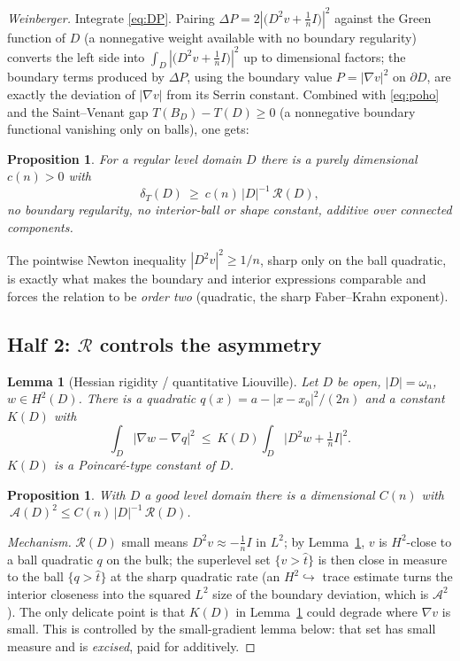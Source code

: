 \documentclass[11pt]{amsart}
\newtheorem{proposition}[theorem]{Proposition}
\newtheorem{lemma}[theorem]{Lemma}
\theoremstyle{definition}
\theoremstyle{remark}
\newcommand{\dT}{\delta_T}
\newcommand{\Asym}{\mathcal A}
\newcommand{\R}{\mathcal R}
\newcommand{\TF}{\bigl(D^2v+\tfrac1n I\bigr)}
\begin{document}
\emph{Weinberger.} Integrate \eqref{eq:DP}. Pairing $\Delta P=2|\TF|^2$
against the Green function of $D$ (a nonnegative weight available with
no boundary regularity) converts the left side into $\int_D|\TF|^2$ up
to dimensional factors; the boundary terms produced by $\Delta P$,
using the boundary value $P=|\nabla v|^2$ on $\partial D$, are exactly
the deviation of $|\nabla v|$ from its Serrin constant. Combined with
\eqref{eq:poho} and the Saint--Venant gap
$T(B_D)-T(D)\ge0$ (a nonnegative boundary functional vanishing only on
balls), one gets:
\begin{proposition}\label{prop:half1}
For a regular level domain $D$ there is a purely dimensional
$c(n)>0$ with
\[
  \dT(D)\ \ge\ c(n)\,|D|^{-1}\,\R(D),
\]
no boundary regularity, no interior-ball or shape constant, additive
over connected components.
\end{proposition}
The pointwise Newton inequality $|D^2v|^2\ge1/n$, sharp only on the
ball quadratic, is exactly what makes the boundary and interior
expressions comparable and forces the relation to be \emph{order two}
(quadratic, the sharp Faber--Krahn exponent).

\subsection{Half 2: $\R$ controls the asymmetry}
\begin{lemma}[Hessian rigidity / quantitative Liouville]\label{lem:korn}
Let $D$ be open, $|D|=\omega_n$, $w\in H^2(D)$. There is a quadratic
$q(x)=a-|x-x_0|^2/(2n)$ and a constant $K(D)$ with
\[
  \int_D|\nabla w-\nabla q|^2\ \le\ K(D)\int_D\bigl|D^2w+\tfrac1n I\bigr|^2 .
\]
$K(D)$ is a Poincar\'e-type constant of $D$.
\end{lemma}
\begin{proposition}\label{prop:half2}
With $D$ a good level domain there is a dimensional $C(n)$ with
$\ \Asym(D)^2\le C(n)\,|D|^{-1}\,\R(D)$.
\end{proposition}
\begin{proof}[Mechanism]
$\R(D)$ small means $D^2v\approx-\tfrac1n I$ in $L^2$; by
Lemma~\ref{lem:korn}, $v$ is $H^2$-close to a ball quadratic $q$ on the
bulk; the superlevel set $\{v>\hat t\}$ is then close in measure to the
ball $\{q>\hat t\}$ at the sharp quadratic rate (an
$H^2\hookrightarrow$ trace estimate turns the interior closeness into
the squared $L^2$ size of the boundary deviation, which is
$\Asym^2$). The only delicate point is that $K(D)$ in
Lemma~\ref{lem:korn} could degrade where $\nabla v$ is small. This is
controlled by the small-gradient lemma below: that set has small
measure and is \emph{excised}, paid for additively.
\end{proof}
\end{document}
